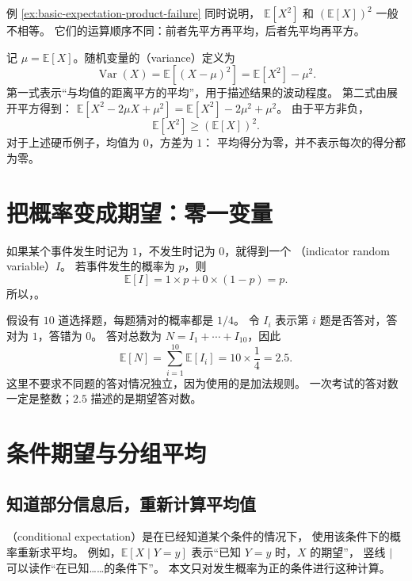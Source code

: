 \documentclass[UTF8]{ctexart}
\begin{document}
例 \ref{ex:basic-expectation-product-failure} 同时说明，
$\mathbb E[X^2]$ 和 $(\mathbb E[X])^2$ 一般不相等。
它们的运算顺序不同：前者先平方再平均，后者先平均再平方。

记 $\mu=\mathbb E[X]$。随机变量的（variance）定义为
\begin{equation}
  \operatorname{Var}(X)
  =\mathbb E[(X-\mu)^2]
  =\mathbb E[X^2]-\mu^2.
  \label{eq:basic-expectation-variance}
\end{equation}
第一式表示“与均值的距离平方的平均”，用于描述结果的波动程度。
第二式由展开平方得到：
$\mathbb E[X^2-2\mu X+\mu^2]
=\mathbb E[X^2]-2\mu^2+\mu^2$。
由于平方非负，
\[
  \mathbb E[X^2]\geq(\mathbb E[X])^2.
\]
对于上述硬币例子，均值为 $0$，方差为 $1$：
平均得分为零，并不表示每次的得分都为零。

\section{把概率变成期望：零一变量}
\label{sec:basic-expectation-indicators}

如果某个事件发生时记为 $1$，不发生时记为 $0$，就得到一个
（indicator random variable）$I$。
若事件发生的概率为 $p$，则
\begin{equation}
  \mathbb E[I]=1\times p+0\times(1-p)=p.
  \label{eq:basic-expectation-indicator}
\end{equation}
所以，。

\begin{example}[猜选择题的期望答对数]
假设有 $10$ 道选择题，每题猜对的概率都是 $1/4$。
令 $I_i$ 表示第 $i$ 题是否答对，答对为 $1$，答错为 $0$。
答对总数为 $N=I_1+\cdots+I_{10}$，因此
\[
  \mathbb E[N]
  =\sum_{i=1}^{10}\mathbb E[I_i]
  =10\times\frac14=2.5.
\]
这里不要求不同题的答对情况独立，因为使用的是加法规则。
一次考试的答对数一定是整数；$2.5$ 描述的是期望答对数。
\end{example}

\section{条件期望与分组平均}
\label{sec:basic-expectation-conditioning}

\subsection{知道部分信息后，重新计算平均值}

（conditional expectation）是在已经知道某个条件的情况下，
使用该条件下的概率重新求平均。
例如，$\mathbb E[X\mid Y=y]$ 表示“已知 $Y=y$ 时，$X$ 的期望”，
竖线 $\mid$ 可以读作“在已知……的条件下”。
本文只对发生概率为正的条件进行这种计算。
\end{document}
